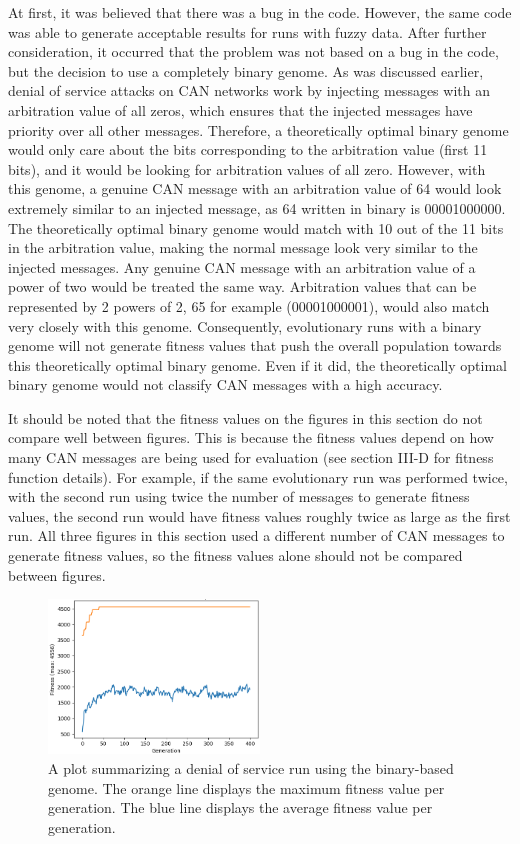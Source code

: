 \documentclass[10pt,conference]{IEEEtran}
\begin{document}
At first, it was believed that there was a bug in the code.  However, the same code was able to generate acceptable results for runs with fuzzy data.  After further consideration, it occurred that the problem was not based on a bug in the code, but the decision to use a completely binary genome.  As was discussed earlier, denial of service attacks on CAN networks work by injecting messages with an arbitration value of all zeros, which ensures that the injected messages have priority over all other messages.  Therefore, a theoretically optimal binary genome would only care about the bits corresponding to the arbitration value (first 11 bits), and it would be looking for arbitration values of all zero.  However, with this genome, a genuine CAN message with an arbitration value of 64 would look extremely similar to an injected message, as 64 written in binary is 00001000000.  The theoretically optimal binary genome would match with 10 out of the 11 bits in the arbitration value, making the normal message look very similar to the injected messages.  Any genuine CAN message with an arbitration value of a power of two would be treated the same way.  Arbitration values that can be represented by 2 powers of 2, 65 for example (00001000001), would also match very closely with this genome.  Consequently, evolutionary runs with a binary genome will not generate fitness values that push the overall population towards this theoretically optimal binary genome.  Even if it did, the theoretically optimal binary genome would not classify CAN messages with a high accuracy.

It should be noted that the fitness values on the figures in this section do not compare well between figures.  This is because the fitness values depend on how many CAN messages are being used for evaluation (see section III-D for fitness function details).  For example, if the same evolutionary run was performed twice, with the second run using twice the number of messages to generate fitness values, the second run would have fitness values roughly twice as large as the first run.  All three figures in this section used a different number of CAN messages to generate fitness values, so the fitness values alone should not be compared between figures.  

\begin{figure}[h]
    \centering
    \includegraphics[width=0.5\textwidth]{bad-dos-cropped.png}
    \caption{A plot summarizing a denial of service run using the binary-based genome.  The orange line displays the maximum fitness value per generation.  The blue line displays the average fitness value per generation.}
    \label{baddos}
\end{figure}
\end{document}
